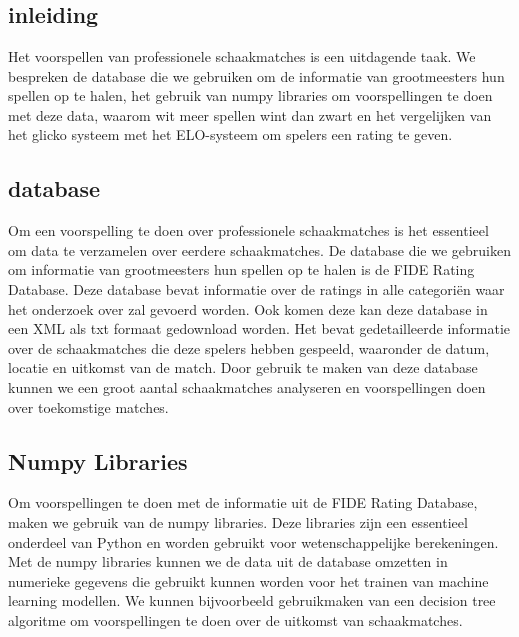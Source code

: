 \chapter{}%
\label{ch:stand-van-zaken}



\section{inleiding}

Het voorspellen van professionele schaakmatches is een uitdagende taak. We bespreken de database die we gebruiken om de informatie van grootmeesters hun spellen op te halen, het gebruik van numpy libraries om voorspellingen te doen met deze data, waarom wit meer spellen wint dan zwart en het vergelijken van het glicko systeem met het ELO-systeem om spelers een rating te geven.

\section{database}

Om een voorspelling te doen over professionele schaakmatches is het essentieel om data te verzamelen over eerdere schaakmatches. De database die we gebruiken om informatie van grootmeesters hun spellen op te halen is de FIDE Rating Database. Deze database bevat informatie over de ratings in alle categoriën waar het onderzoek over zal gevoerd worden. Ook komen deze kan deze database in een XML als txt formaat gedownload worden. Het bevat gedetailleerde informatie over de schaakmatches die deze spelers hebben gespeeld, waaronder de datum, locatie en uitkomst van de match. Door gebruik te maken van deze database kunnen we een groot aantal schaakmatches analyseren en voorspellingen doen over toekomstige matches. 

\section{Numpy Libraries}

Om voorspellingen te doen met de informatie uit de FIDE Rating Database, maken we gebruik van de numpy libraries. Deze libraries zijn een essentieel onderdeel van Python en worden gebruikt voor wetenschappelijke berekeningen. Met de numpy libraries kunnen we de data uit de database omzetten in numerieke gegevens die gebruikt kunnen worden voor het trainen van machine learning modellen. We kunnen bijvoorbeeld gebruikmaken van een decision tree algoritme om voorspellingen te doen over de uitkomst van schaakmatches.


